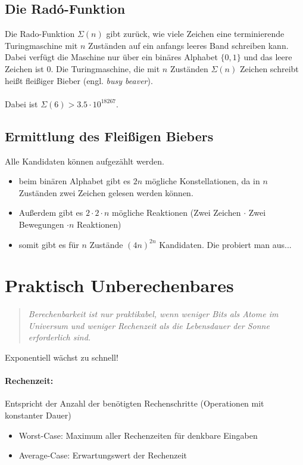 \documentclass{article}
\begin{document}
\subsection{Die Rad\'o-Funktion}
Die Rado-Funktion $\Sigma(n)$ gibt zur\"uck, wie viele Zeichen eine terminierende Turingmaschine mit $n$ Zuständen auf ein anfangs leeres Band schreiben kann. Dabei verfügt die Maschine nur über ein binäres Alphabet $\{0, 1\}$ und das leere Zeichen ist $0$. Die Turingmaschine, die mit $n$ Zuständen $\Sigma(n)$ Zeichen schreibt heißt fleißiger Bieber (engl. \emph{busy beaver}).\\
\\
Dabei ist $\Sigma(6) > 3.5 \cdot 10^{18267}$.

\subsection{Ermittlung des Fleißigen Biebers}

Alle Kandidaten können aufgezählt werden.
\begin{itemize}
    \item beim binären Alphabet gibt es $2n$ mögliche Konstellationen, da in $n$ Zuständen zwei Zeichen gelesen werden können.
    \item Außerdem gibt es $2\cdot2\cdot n$ mögliche Reaktionen (Zwei Zeichen $\cdot$ Zwei Bewegungen $\cdot n$ Reaktionen)
    \item somit gibt es für $n$ Zustände $(4n)^{2n}$ Kandidaten. Die probiert man aus...
\end{itemize}
\section{Praktisch Unberechenbares}
\begin{quote}
    \emph{
        Berechenbarkeit ist nur praktikabel, wenn weniger Bits als Atome im Universum und weniger Rechenzeit als die Lebensdauer der Sonne erforderlich sind.
    }
\end{quote}
\Rightarrow Exponentiell w\"achst zu schnell!
\paragraph*{Rechenzeit:}
Entspricht der Anzahl der benötigten Rechenschritte (Operationen mit konstanter Dauer)
\begin{itemize}
    \item Worst-Case: Maximum aller Rechenzeiten für denkbare Eingaben
    \item Average-Case: Erwartungswert der Rechenzeit
\end{itemize}
\end{document}

